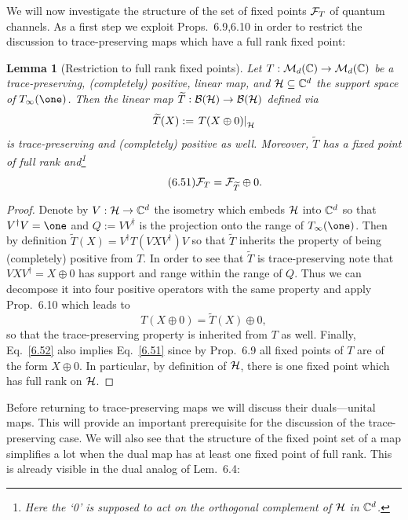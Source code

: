 \documentclass[11pt,a4paper]{article}
\theoremstyle{plain}
\newtheorem{lemma}{Lemma}[section]
\theoremstyle{definition}
\theoremstyle{remark}
\begin{document}
We will now investigate the structure of the set of fixed points $\mathcal{F}_T$ of
quantum channels. As a first step we exploit Props.~6.9,6.10 in order to restrict
the discussion to trace-preserving maps which have a full rank fixed point:

\begin{lemma}[Restriction to full rank fixed points]
    Let $T:\mathcal{M}_d(\mathbb{C})\to\mathcal{M}_d(\mathbb{C})$ be a trace-preserving, (completely) positive,
    linear map, and $\mathcal{H}\subseteq \mathbb{C}^d$ the support space of $T_\infty(\one)$. Then
    the linear map $\widetilde{T}:\mathcal{B}(\mathcal{H})\to\mathcal{B}(\mathcal{H})$ defined via
    \[
        \widetilde{T}(X) := \left.T(X\oplus 0)\right|_{\mathcal{H}}
    \]
    is trace-preserving and (completely) positive as well. Moreover, $\widetilde{T}$
    has a fixed point of full rank and\footnote{Here the `0' is supposed to act on
        the orthogonal complement of $\mathcal{H}$ in $\mathbb{C}^d$.}
    \begin{equation}\tag{6.51}
        \mathcal{F}_T = \mathcal{F}_{\widetilde{T}} \oplus 0.
    \end{equation}
\end{lemma}

\begin{proof}
    Denote by $V:\mathcal{H}\to\mathbb{C}^d$ the isometry which embeds $\mathcal{H}$ into $\mathbb{C}^d$ so that
    $V^\dagger V=\one$ and $Q:=VV^\dagger$ is the projection onto the range of
    $T_\infty(\one)$. Then by definition $\widetilde{T}(X)=V^\dagger T(VXV^\dagger)V$
    so that $\widetilde{T}$ inherits the property of being (completely) positive from
    $T$. In order to see that $\widetilde{T}$ is trace-preserving note that
    $VXV^\dagger=X\oplus 0$ has support and range within the range of $Q$. Thus we
    can decompose it into four positive operators with the same property and apply
    Prop.~6.10 which leads to
    \begin{equation}\tag{6.52}
        T(X\oplus 0) = \widetilde{T}(X)\oplus 0,
    \end{equation}
    so that the trace-preserving property is inherited from $T$ as well. Finally,
    Eq.~\eqref{6.52} also implies Eq.~\eqref{6.51} since by Prop.~6.9 all fixed points
    of $T$ are of the form $X\oplus 0$. In particular, by definition of $\mathcal{H}$, there
    is one fixed point which has full rank on $\mathcal{H}$.
\end{proof}

Before returning to trace-preserving maps we will discuss their duals---unital
maps. This will provide an important prerequisite for the discussion of the
trace-preserving case. We will also see that the structure of the fixed point set
of a map simplifies a lot when the dual map has at least one fixed point of full
rank. This is already visible in the dual analog of Lem.~6.4:
\end{document}
